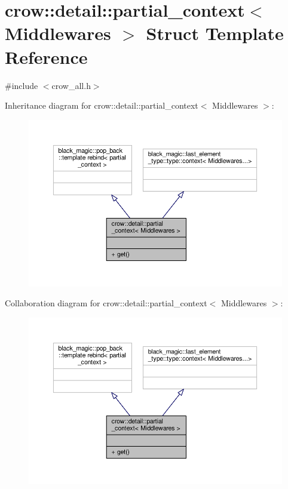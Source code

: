 \hypertarget{structcrow_1_1detail_1_1partial__context}{\section{crow\-:\-:detail\-:\-:partial\-\_\-context$<$ Middlewares $>$ Struct Template Reference}
\label{structcrow_1_1detail_1_1partial__context}
}


{\ttfamily \#include $<$crow\-\_\-all.\-h$>$}



Inheritance diagram for crow\-:\-:detail\-:\-:partial\-\_\-context$<$ Middlewares $>$\-:
\nopagebreak
\begin{figure}[H]
\begin{center}
\leavevmode
\includegraphics[width=350pt]{structcrow_1_1detail_1_1partial__context__inherit__graph}
\end{center}
\end{figure}


Collaboration diagram for crow\-:\-:detail\-:\-:partial\-\_\-context$<$ Middlewares $>$\-:
\nopagebreak
\begin{figure}[H]
\begin{center}
\leavevmode
\includegraphics[width=350pt]{structcrow_1_1detail_1_1partial__context__coll__graph}
\end{center}
\end{figure}
